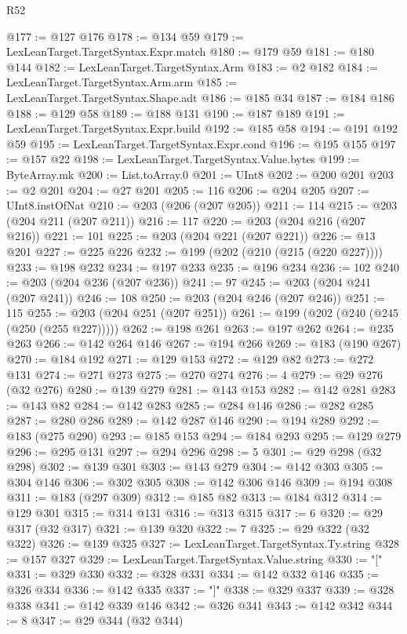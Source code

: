 \begin{lexlean}{R52}
\begin{coremodule}
@177 := @127 @176
@178 := @134 @59
@179 := LexLeanTarget.TargetSyntax.Expr.match
@180 := @179 @59
@181 := @180 @144
@182 := LexLeanTarget.TargetSyntax.Arm
@183 := @2 @182
@184 := LexLeanTarget.TargetSyntax.Arm.arm
@185 := LexLeanTarget.TargetSyntax.Shape.adt
@186 := @185 @34
@187 := @184 @186
@188 := @129 @58
@189 := @188 @131
@190 := @187 @189
@191 := LexLeanTarget.TargetSyntax.Expr.build
@192 := @185 @58
@194 := @191 @192 @59
@195 := LexLeanTarget.TargetSyntax.Expr.cond
@196 := @195 @155
@197 := @157 @22
@198 := LexLeanTarget.TargetSyntax.Value.bytes
@199 := ByteArray.mk
@200 := List.toArray.{0}
@201 := UInt8
@202 := @200 @201
@203 := @2 @201
@204 := @27 @201
@205 := 116
@206 := @204 @205
@207 := UInt8.instOfNat
@210 := @203 (@206 (@207 @205))
@211 := 114
@215 := @203 (@204 @211 (@207 @211))
@216 := 117
@220 := @203 (@204 @216 (@207 @216))
@221 := 101
@225 := @203 (@204 @221 (@207 @221))
@226 := @13 @201
@227 := @225 @226
@232 := @199 (@202 (@210 (@215 (@220 @227))))
@233 := @198 @232
@234 := @197 @233
@235 := @196 @234
@236 := 102
@240 := @203 (@204 @236 (@207 @236))
@241 := 97
@245 := @203 (@204 @241 (@207 @241))
@246 := 108
@250 := @203 (@204 @246 (@207 @246))
@251 := 115
@255 := @203 (@204 @251 (@207 @251))
@261 := @199 (@202 (@240 (@245 (@250 (@255 @227)))))
@262 := @198 @261
@263 := @197 @262
@264 := @235 @263
@266 := @142 @264 @146
@267 := @194 @266
@269 := @183 (@190 @267)
@270 := @184 @192
@271 := @129 @153
@272 := @129 @82
@273 := @272 @131
@274 := @271 @273
@275 := @270 @274
@276 := 4
@279 := @29 @276 (@32 @276)
@280 := @139 @279
@281 := @143 @153
@282 := @142 @281
@283 := @143 @82
@284 := @142 @283
@285 := @284 @146
@286 := @282 @285
@287 := @280 @286
@289 := @142 @287 @146
@290 := @194 @289
@292 := @183 (@275 @290)
@293 := @185 @153
@294 := @184 @293
@295 := @129 @279
@296 := @295 @131
@297 := @294 @296
@298 := 5
@301 := @29 @298 (@32 @298)
@302 := @139 @301
@303 := @143 @279
@304 := @142 @303
@305 := @304 @146
@306 := @302 @305
@308 := @142 @306 @146
@309 := @194 @308
@311 := @183 (@297 @309)
@312 := @185 @82
@313 := @184 @312
@314 := @129 @301
@315 := @314 @131
@316 := @313 @315
@317 := 6
@320 := @29 @317 (@32 @317)
@321 := @139 @320
@322 := 7
@325 := @29 @322 (@32 @322)
@326 := @139 @325
@327 := LexLeanTarget.TargetSyntax.Ty.string
@328 := @157 @327
@329 := LexLeanTarget.TargetSyntax.Value.string
@330 := "["
@331 := @329 @330
@332 := @328 @331
@334 := @142 @332 @146
@335 := @326 @334
@336 := @142 @335
@337 := "]"
@338 := @329 @337
@339 := @328 @338
@341 := @142 @339 @146
@342 := @326 @341
@343 := @142 @342
@344 := 8
@347 := @29 @344 (@32 @344)

\end{coremodule}
\end{lexlean}
